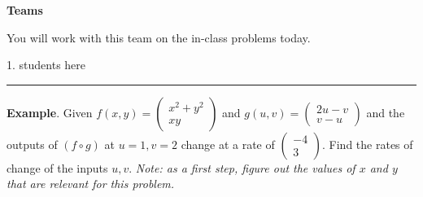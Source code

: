 \documentclass[12pt,letterpaper,noanswers]{exam}
\begin{document}








\noindent\textbf{Teams}

You will work with this team on the in-class problems today.
\begin{multicols}{2}
1.  students here


\end{multicols}

\hrule
\vspace{0.2cm}
\noindent\textbf{Example}. Given $f(x,y) = \left(\begin{array}{c} x^2+y^2 \\ xy \end{array}\right)$ and $g(u,v) = \left(\begin{array}{c} 2u - v \\ v-u \end{array}\right)$ and the outputs of $(f \circ g)$ at $u=1, v=2$ change at a rate of $\left(\begin{array}{c} -4 \\ 3 \end{array}\right)$.  Find the rates of change of the inputs $u, v$.  \emph{Note: as a first step, figure out the values of $x$ and $y$ that are relevant for this problem.}
    
\end{document}
